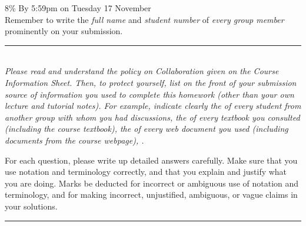 \documentclass[11pt,twoside]{article}
\begin{document}
\noindent
{}  8\%
\hfill
{}  By 5:59pm on Tuesday 17 November\\[2ex]
\strong
   {Remember to write
    the \emph{full name} and \emph{student number}
    of \emph{every group member}
    prominently on your submission.}

\medskip

\noindent
\rule{\textwidth}{.5pt}\\[1ex]
\begingroup\slshape
    Please read and understand the policy on Collaboration
    given on the Course Information Sheet.
    Then, to protect yourself,
    list on the front of your submission
     source of information
    you used to complete this homework
    (other than your own lecture and tutorial notes).
    For example, indicate clearly
    the  of every student from another group
    with whom you had discussions,
    the  of every textbook you consulted
    (including the course textbook),
    the  of every web document you used
    (including documents from the course webpage),
    \etc.\par
        For each question, please write up detailed answers carefully.
    Make sure that you use notation and terminology correctly, and
    that you explain and justify what you are doing.
    Marks  be deducted
    for incorrect or ambiguous use of notation and terminology, and
    for making incorrect, unjustified, ambiguous, or vague claims
    in your solutions.
\endgroup\\
\rule{\textwidth}{.5pt}
\end{document}
